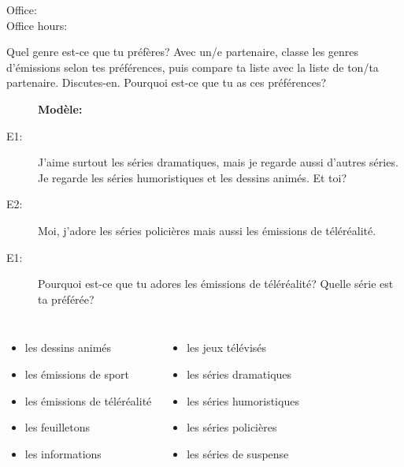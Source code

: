 \documentclass{beamer}
\subtitle[Écran et prépositions]{L'écran et les prépositions de temps}
\begin{document}
  \begin{frame}
    \titlepage
    \tiny{Office: \\
          Office hours: }
  \end{frame}

  \begin{frame}{Quel genre est-ce que tu préfères?}
    \scriptsize
    Avec un/e partenaire, classe les genres d'émissions selon tes préférences, puis compare ta liste avec la liste de ton/ta partenaire.
    Discutes-en. Pourquoi est-ce que tu as ces préférences?
    \begin{description}
      \item[] \textbf{Modèle:}
      \item[E1:] J'aime surtout les séries dramatiques, mais je regarde aussi d'autres séries. Je regarde les séries humoristiques et les dessins animés. Et toi?
      \item[E2:] Moi, j'adore les séries policières mais aussi les émissions de téléréalité.
      \item[E1:] Pourquoi est-ce que tu adores les émissions de téléréalité? Quelle série est ta préférée?
    \end{description}
    \begin{columns}[t]
        \begin{itemize}
          \item les dessins animés
          \item les émissions de sport
          \item les émissions de téléréalité
          \item les feuilletons
          \item les informations
        \end{itemize}
        \begin{itemize}
          \item les jeux télévisés
          \item les séries dramatiques
          \item les séries humoristiques
          \item les séries policières
          \item les séries de suspense
        \end{itemize}
    \end{columns}
  \end{frame}
\end{document}
